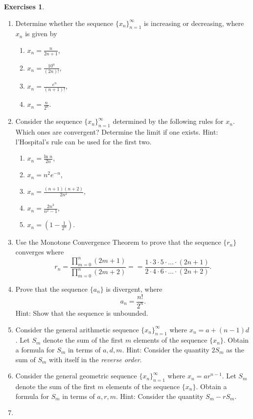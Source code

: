 \documentclass[extrafontsizes, twoside, a4paper]{memoir}
\theoremstyle{plain}%
\theoremstyle{definition}
\newtheorem{exer}{Exercises}[chapter]
\theoremstyle{remark}
\newcommand{\postitemskip}{\vskip 0.2in}
\begin{document}
\begin{exer}
\begin{enumerate}
\item
 Determine whether the sequence $\{ x_n \}_{n=1}^\infty$ is
increasing or decreasing, where $x_n$ is given by
\begin{enumerate}
\item
$x_n = \frac{n}{2n+1}$,
\item
$x_n = \frac{10^n}{(2n)!} $,
\item
$x_n = \frac{e^n}{(n+1)!} $,
\item
$x_n = \frac{n}{2^n} $.
\end{enumerate}
\postitemskip
\item
 Consider the sequence $\{ x_n \}_{n=1}^\infty$ determined by the
following rules for $x_n$. Which ones are convergent? Determine the
limit if one exists. Hint: l'Hospital's rule can be used for the first two.
\begin{enumerate}
\item
$x_n = \frac{\text{ln } n}{2n}$,
\item
$x_n = n^2 e^{-n} $,
\item
$x_n = \frac{(n+1)(n+2)}{2n^2}$,
\item
$x_n = \frac{2n^3}{n^2 - 1}$,
\item
$x_n = \left (1 - \frac{1}{2^n} \right ) .$
\end{enumerate}
\postitemskip
\item
Use the Monotone Convergence Theorem to prove that the sequence $\{ r_n\}$ converges where
$$r_n = \frac{\prod\limits_{m=0}^{n} (2m+1)}{\prod\limits_{m=0}^n (2m+2)}
== \frac{1 \cdot 3 \cdot 5 \cdot \dots \cdot (2n+1)}{2 \cdot 4 \cdot 6 \cdot \dots \cdot (2n+2)}.$$
\postitemskip
\item
Prove that the sequence $\{ a_n\}$ is divergent, where
$$a_n = \frac{n!}{2^n} .$$
Hint: Show that the sequence is unbounded.
\postitemskip
\item
 Consider the general arithmetic sequence $\{ x_n \}_{n=1}^\infty$
where $x_n = a + (n-1)d$. Let $S_m$ denote the sum of the first $m$
elements of the sequence $\{ x_n \}$. Obtain a formula for $S_m$ in
terms of $a,d,m$. Hint: Consider the quantity $2S_m$ as the sum of
$S_m$ with itself in the \emph{reverse order}.
\postitemskip
\item
 Consider the general geometric sequence $\{ x_n \}_{n=1}^\infty$
where $x_n = ar^{n-1}$. Let $S_m$ denote the sum of the first $m$
elements of the sequence $\{ x_n \}$. Obtain a formula for $S_m$ in
terms of $a,r,m$. Hint: Consider the quantity $S_m - rS_m$.
\postitemskip
\item

\end{enumerate}
\end{exer}
\end{document}
